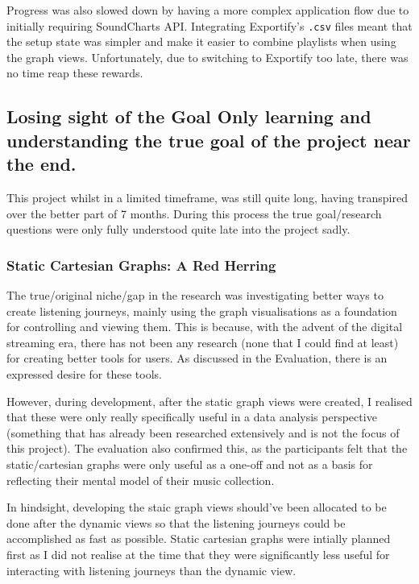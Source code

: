 Progress was also slowed down by having a more complex application flow due to initially requiring SoundCharts API. Integrating Exportify's \lstinline|.csv| files meant that the setup state was simpler and make it easier to combine playlists when using the graph views. Unfortunately, due to switching to Exportify too late, there was no time reap these rewards.

\subsection{
    Losing sight of the Goal
    Only learning and understanding the true goal of the project near the end.
}%

This project whilst in a limited timeframe, was still quite long, having transpired over the better part of 7 months. During this process the true goal/research questions were only fully understood quite late into the project sadly.

\subsubsection{Static Cartesian Graphs: A Red Herring}
The true/original niche/gap in the research was investigating better ways to create listening journeys, mainly using the graph visualisations as a foundation for controlling and viewing them. This is because, with the advent of the digital streaming era, there has not been any research (none that I could find at least) for creating better tools for users. As discussed in the Evaluation, there is an expressed desire for these tools.

However, during development, after the static graph views were created, I realised that these were only really specifically useful in a data analysis perspective (something that has already been researched extensively and is not the focus of this project). The evaluation also confirmed this, as the participants felt that the static/cartesian graphs were only useful as a one-off and not as a basis for reflecting their mental model of their music collection.

In hindsight, developing the staic graph views should've been allocated to be done after the dynamic views so that the listening journeys could be accomplished as fast as possible. Static cartesian graphs were intially planned first as I did not realise at the time that they were significantly less useful for interacting with listening journeys than the dynamic view.


